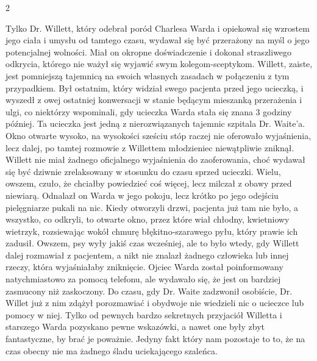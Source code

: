 \begin{center}
2
\end{center}

Tylko Dr. Willett, który odebrał poród Charlesa Warda i opiekował się wzrostem jego ciała i umysłu od tamtego czasu, wydawał się być przerażony na myśl o jego potencjalnej wolności. Miał on okropne doświadczenie i dokonał straszliwego odkrycia, którego nie ważył się wyjawić swym kolegom-sceptykom. Willett, zaiste, jest pomniejszą tajemnicą na swoich własnych zasadach w połączeniu z tym przypadkiem. Był ostatnim, który widział swego pacjenta przed jego ucieczką, i wyszedł z owej ostatniej konwersacji w stanie będącym mieszanką przerażenia i ulgi, co niektórzy wspominali, gdy ucieczka Warda stała się znana 3 godziny później. Ta ucieczka jest jedną z nierozwiązanych tajemnic szpitala Dr. Waite'a. Okno otwarte wysoko, na wysokości sześciu stóp raczej nie oferowało wyjaśnienia, lecz dalej, po tamtej rozmowie z Willettem młodzieniec niewątpliwie zniknął. Willett nie miał żadnego oficjalnego wyjaśnienia do zaoferowania, choć wydawał się być dziwnie zrelaksowany w stosunku do czasu sprzed ucieczki. Wielu, owszem, czuło, że chciałby powiedzieć coś więcej, lecz milczał z obawy przed niewiarą. Odnalazł on Warda w jego pokoju, lecz krótko po jego odejściu pielęgniarze pukali na nic. Kiedy otworzyli drzwi, pacjenta już tam nie było, a wszystko, co odkryli, to otwarte okno, przez które wiał chłodny, kwietniowy wietrzyk, rozsiewając wokół chmurę błękitno-szarawego pyłu, który prawie ich zadusił. Owszem, psy wyły jakiś czas wcześniej, ale to było wtedy, gdy Willett dalej rozmawiał z pacjentem, a nikt nie znalazł żadnego człowieka lub innej rzeczy, która wyjaśniałaby zniknięcie. Ojciec Warda został poinformowany natychmiastowo za pomocą telefonu, ale wydawało się, że jest on bardziej zasmucony niż zaskoczony. Do czasu, gdy Dr. Waite zadzwonił osobiście, Dr. Willet już z nim zdążył porozmawiać i obydwoje nie wiedzieli nic o ucieczce lub pomocy w niej. Tylko od pewnych bardzo sekretnych przyjaciół Willetta i starszego Warda pozyskano pewne wskazówki, a nawet one były zbyt fantastyczne, by brać je poważnie. Jedyny fakt który nam pozostaje to to, że na czas obecny nie ma żadnego śladu uciekającego szaleńca.

